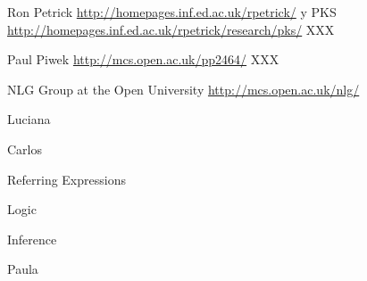 Ron Petrick \url{http://homepages.inf.ed.ac.uk/rpetrick/} y
PKS \url{http://homepages.inf.ed.ac.uk/rpetrick/research/pks/} XXX

Paul Piwek \url{http://mcs.open.ac.uk/pp2464/} XXX

NLG Group at the Open University \url{http://mcs.open.ac.uk/nlg/}


Luciana
\citep{benotti09c}
\citep{benotti09b}

Carlos

Referring Expressions
\citep{AKS08}
\citep{AF08}

Logic
\citep{ABM01}
\citep{arec:hybr05b}

Inference
\citep{AG06}
\citep{ANR01}

Paula
\citep{estr:femt09}
\citep{estr:expe05}
\citep{estr:impr08}
\citep{estr:newm07}
\citep{estr:howm07}
\citep{pope:estr07}
\citep{pope:mode06}
\citep{estr:find05}

